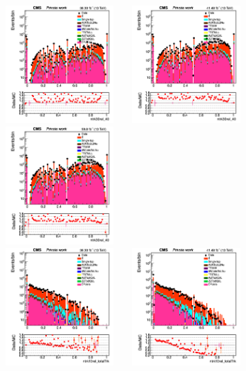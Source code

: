 \documentclass{cernatlasnote}
\begin{document}
  
  

  \begin{figure}[htp]
\centering
\includegraphics[width=4.6cm, height=4.4cm]{images/emu_channel/2016/16_Range_0pt2_1pt8/track_ntrk30rel_TRK_Log.png}
\includegraphics[width=4.6cm, height=4.4cm]{images/emu_channel/2017/17_Range_0pt2_1pt8/track_ntrk30rel_TRK_Log.png}
 \includegraphics[width=4.6cm, height=4.4cm]{images/emu_channel/2018/18_Range_0pt2_1pt8/track_ntrk30rel_TRK_Log.png}\\
 \includegraphics[width=4.6cm, height=4.4cm]{images/emu_channel/2016/16_Range_0pt2_1pt8/track_ntrk10reltot_TRK_Log.png}
\includegraphics[width=4.6cm, height=4.4cm]{images/emu_channel/2017/17_Range_0pt2_1pt8/track_ntrk10reltot_TRK_Log.png}

\end{figure}
\end{document}
